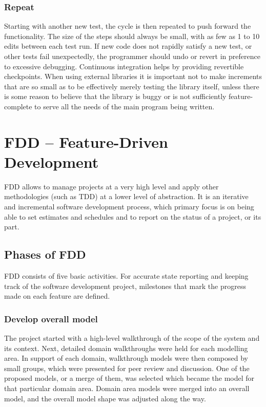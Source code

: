 \subsubsection{Repeat}

Starting with another new test, the cycle is then repeated to push forward the functionality. The size of the steps should always be small, with as few as 1 to 10 edits between each test run. If new code does not rapidly satisfy a new test, or other tests fail unexpectedly, the programmer should undo or revert in preference to excessive debugging. Continuous integration helps by providing revertible checkpoints. When using external libraries it is important not to make increments that are so small as to be effectively merely testing the library itself, unless there is some reason to believe that the library is buggy or is not sufficiently feature-complete to serve all the needs of the main program being written.



\section{FDD -- Feature-Driven Development}

FDD allows to manage projects at a very high level and apply other methodologies (such as TDD) at a lower level of abstraction. It is an iterative and incremental software development process, which primary focus is on being able to set estimates and schedules and to report on the status of a project, or its part. 

\subsection{Phases of FDD}

FDD consists of five basic activities. For accurate state reporting and keeping track of the software development project, milestones that mark the progress made on each feature are defined.

\subsubsection{Develop overall model}
The project started with a high-level walkthrough of the scope of the system and its context. Next, detailed domain walkthroughs were held for each modelling area. In support of each domain, walkthrough models were then composed by small groups, which were presented for peer review and discussion. One of the proposed models, or a merge of them, was selected which became the model for that particular domain area. Domain area models were merged into an overall model, and the overall model shape was adjusted along the way.


